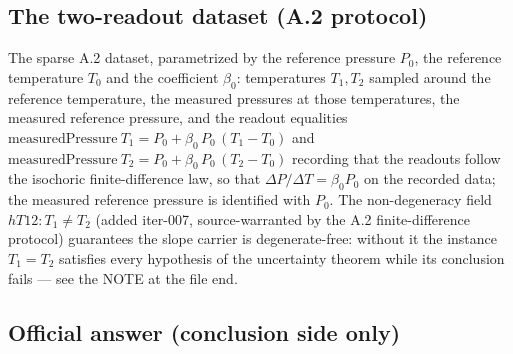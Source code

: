 \subsection*{The two-readout dataset (A.2 protocol)}

\begin{definition}
\label{def:IPhO2026Problems_problem_IPhO_2026_4_A_5:IsochoricReadout}
The sparse A.2 dataset, parametrized by the reference pressure $P_0$, the
reference temperature $T_0$ and the coefficient $\beta_0$: temperatures
$T_1, T_2$ sampled around the reference temperature, the measured
pressures at those temperatures, the measured reference pressure, and the
readout equalities
$\mathrm{measuredPressure}\ T_1 = P_0 + \beta_0\,P_0\,(T_1 - T_0)$ and
$\mathrm{measuredPressure}\ T_2 = P_0 + \beta_0\,P_0\,(T_2 - T_0)$
recording that the readouts follow the isochoric finite-difference law, so
that $\Delta P/\Delta T = \beta_0 P_0$ on the recorded data; the measured
reference pressure is identified with $P_0$.  The non-degeneracy field
$hT12 : T_1 \ne T_2$ (added iter-007, source-warranted by the A.2
finite-difference protocol) guarantees the slope carrier is
degenerate-free: without it the instance $T_1 = T_2$ satisfies every
hypothesis of the uncertainty theorem while its conclusion fails --- see
the NOTE at the file end.
\end{definition}

\subsection*{Official answer (conclusion side only)}

